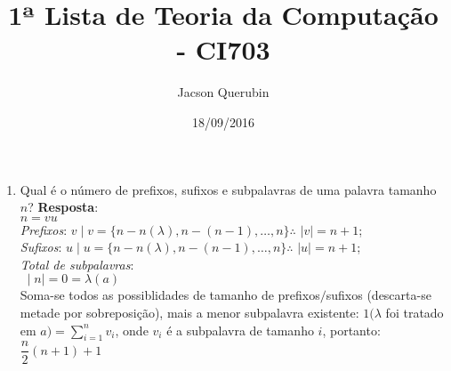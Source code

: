 \documentclass[a4paper,12pt]{article}
\title{1ª Lista de Teoria da Computação - CI703}
\author{Jacson Querubin}
\date{18/09/2016}
\begin{document}
\maketitle

\begin{enumerate}
	\item Qual é o número de prefixos, sufixos e subpalavras de uma palavra tamanho $n$?
		\textbf{Resposta}:\\ 
		\hspace*{55pt}$  n = vu  $\\
		\hspace*{35pt}\textit{Prefixos}: $ v \mid v = \{n-n(\lambda), n-(n-1), \ldots, n\} \therefore $   $ \mid v\mid = n+1$; \\
		\hspace*{35pt}\textit{Sufixos}: $ u \mid u = \{n-n(\lambda), n-(n-1), \ldots, n\} \therefore $    $ \mid u\mid = n+1$; \\
		\hspace*{35pt}\textit{Total de subpalavras}: \\
		\hspace*{55pt}$\;  \mid n \mid = 0 = \lambda  (a)$ \\
		\hspace*{55pt} Soma-se todos as possiblidades de tamanho de prefixos$/$sufixos (descarta-se metade por sobreposição), mais a menor subpalavra existente: $1 (\lambda$ foi tratado em $a) = \sum_{i=1}^{n}v_{i}$, onde $v_{i}$ é a subpalavra de tamanho $i$, portanto: \\ 
		\hspace*{55pt} $ \dfrac{n}{2}(n+1) + 1$  


\end{enumerate}
\end{document}
